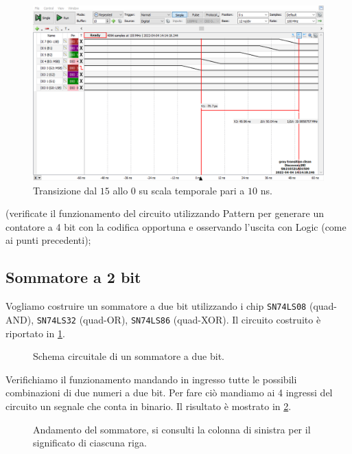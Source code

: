 \documentclass[10pt, a4paper, italian]{article}
\begin{document}
\begin{figure}[htbp]
    \centering
    \includegraphics[width=\textwidth]{gray10ns}
    \caption{Transizione dal $15$ allo $0$ su scala temporale pari a $10$ ns.}
\end{figure}
(verificate il funzionamento del circuito utilizzando Pattern per generare un contatore a 4 bit con la codifica opportuna e osservando l’uscita con Logic (come ai punti precedenti);\\


\subsection{Sommatore a 2 bit}
Vogliamo costruire un sommatore a due bit utilizzando i chip
\texttt{SN74LS08} (quad-AND), \texttt{SN74LS32} (quad-OR), 
\texttt{SN74LS86} (quad-XOR). Il circuito costruito è riportato in
\cref{fig: fulladder}.

\begin{figure}[htbp]
    \centering
    \caption{Schema circuitale di un sommatore a due bit.}
    \label{fig: fulladder}
\end{figure}

Verifichiamo il funzionamento mandando in ingresso tutte le possibili combinazioni di due numeri a due bit. Per fare ciò mandiamo ai 4 ingressi del circuito un segnale che conta in binario. Il risultato è mostrato in \cref{fig: faAD2}.

\begin{figure}[htbp]
    \centering
    \caption{Andamento del sommatore, si consulti la colonna di sinistra per il significato di ciascuna riga.}
    \label{fig: faAD2}
\end{figure}
\end{document}
